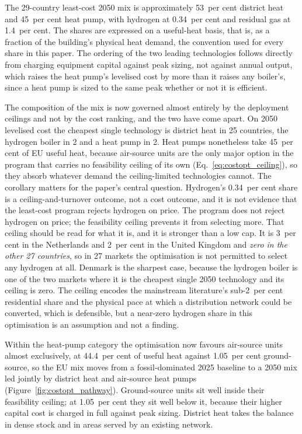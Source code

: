 The 29-country least-cost 2050 mix is approximately 53~per cent district heat and
45~per cent heat pump, with hydrogen at 0.34~per cent and residual gas at
1.4~per cent. The shares are expressed on a useful-heat basis, that is, as a
fraction of the building's physical heat demand, the convention used for every
share in this paper. The ordering of the two leading technologies
follows directly from charging equipment capital against peak sizing, not against annual output, which raises the heat pump's levelised cost by more than it
raises any boiler's, since a heat pump is sized to the same peak whether or not it
is efficient.

The composition of the mix is now governed almost entirely by the deployment
ceilings and not by the cost ranking, and the two have come apart. On 2050
levelised cost the cheapest single technology is district heat in 25 countries, the
hydrogen boiler in 2 and a heat pump in 2. Heat pumps nonetheless
take 45~per cent of EU useful heat, because air-source units are the only major
option in the program that carries no feasibility ceiling of its own
(Eq.~\eqref{eq:costopt_ceiling}), so they absorb whatever demand the ceiling-limited
technologies cannot. The corollary matters for the paper's central question.
Hydrogen's 0.34~per cent share is a ceiling-and-turnover outcome, not a cost
outcome, and it is not evidence that the least-cost program
rejects hydrogen on price. The program does not reject hydrogen on price; the
feasibility ceiling prevents it from selecting more. That ceiling should be read for
what it is, and it is stronger than a low cap. It is 3~per cent in the Netherlands and
2~per cent in the United Kingdom and \emph{zero in the other 27 countries}, so in 27
markets the optimisation is not permitted to select any hydrogen at all. Denmark is the
sharpest case, because the hydrogen boiler is one of the two markets where it is the
cheapest single 2050 technology and its ceiling is zero. The ceiling encodes the
mainstream literature's sub-2~per cent residential share and the physical pace at which
a distribution network could be converted, which is defensible, but a near-zero
hydrogen share in this optimisation is an assumption and not a finding.

Within the heat-pump category the optimisation now favours air-source units almost
exclusively, at 44.4~per cent of useful heat against 1.05~per cent ground-source, so
the EU mix moves from a fossil-dominated 2025 baseline to a 2050 mix led jointly by
district heat and air-source heat pumps (Figure~\ref{fig:costopt_pathway}).
Ground-source units sit well inside their feasibility ceiling; at 1.05~per cent they sit well below it, because their higher capital cost is charged in full against peak sizing. District heat
takes the balance in dense stock and in areas served by an existing network.

